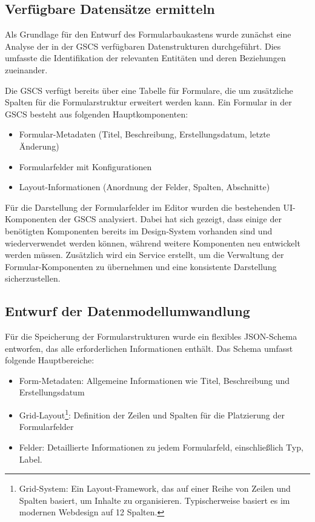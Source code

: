 \documentclass[a4paper,11pt]{article}
\begin{document}
\subsection{Verfügbare Datensätze ermitteln}
Als Grundlage für den Entwurf des Formularbaukastens wurde zunächst eine Analyse der in der GSCS verfügbaren Datenstrukturen durchgeführt. Dies umfasste die Identifikation der relevanten Entitäten und deren Beziehungen zueinander.

\noindent Die GSCS verfügt bereits über eine Tabelle für Formulare, die um zusätzliche Spalten für die Formularstruktur erweitert werden kann. Ein Formular in der GSCS besteht aus folgenden Hauptkomponenten:

\begin{itemize}
  \item Formular-Metadaten (Titel, Beschreibung, Erstellungsdatum, letzte Änderung)
  \item Formularfelder mit Konfigurationen
  \item Layout-Informationen (Anordnung der Felder, Spalten, Abschnitte)
\end{itemize}

\noindent Für die Darstellung der Formularfelder im Editor wurden die bestehenden UI-Komponenten der GSCS analysiert. Dabei hat sich gezeigt, dass einige der benötigten Komponenten bereits im Design-System vorhanden sind und wiederverwendet werden können, während weitere Komponenten neu entwickelt werden müssen. Zusätzlich wird ein Service erstellt, um die Verwaltung der Formular-Komponenten zu übernehmen und eine konsistente Darstellung sicherzustellen.

\subsection{Entwurf der Datenmodellumwandlung}
Für die Speicherung der Formularstrukturen wurde ein flexibles JSON-Schema entworfen, das alle erforderlichen Informationen enthält. Das Schema umfasst folgende Hauptbereiche:

\begin{itemize}
  \item Form-Metadaten: Allgemeine Informationen wie Titel, Beschreibung und Erstellungsdatum
  \item Grid-Layout\footnote{Grid-System: Ein Layout-Framework, das auf einer Reihe von Zeilen und Spalten basiert, um Inhalte zu organisieren. Typischerweise basiert es im modernen Webdesign auf 12 Spalten.}: Definition der Zeilen und Spalten für die Platzierung der Formularfelder
  \item Felder: Detaillierte Informationen zu jedem Formularfeld, einschließlich Typ, Label.
\end{itemize}
\end{document}
